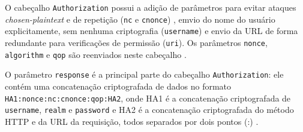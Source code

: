 \documentclass[12pt]{article}
\begin{document}
O cabeçalho \texttt{Authorization} possui a adição de parâmetros para evitar ataques \emph{chosen-plaintext} e de repetição (\texttt{nc} e \texttt{cnonce}) \cite{RFC7616}, emvio do nome do usuário explicitamente, sem nenhuma criptografia (\texttt{username}) e envio da URL de forma redundante para verificações de permissão (\texttt{uri}). Os parâmetros \texttt{nonce}, \texttt{algorithm} e \texttt{qop} são reenviados neste cabeçalho \cite{CHAPMAN2012}.





O parâmetro \texttt{response} é a principal parte do cabeçalho \texttt{Authorization}: ele contém uma concatenação criptografada de dados no formato \texttt{HA1:nonce:nc:cnonce:qop:HA2}, onde HA1 é a concatenação criptografada de \texttt{username}, \texttt{realm} e \texttt{password} e HA2 é a concatenação criptografada do método HTTP e da URL da requisição, todos separados por dois pontos (:) \cite{CHAPMAN2012}.
\end{document}
